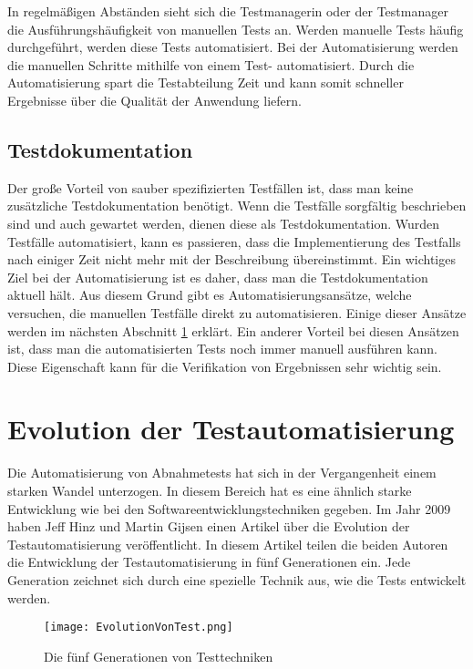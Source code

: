 In regelmäßigen Abständen sieht sich die Testmanagerin oder der Testmanager die Ausführungshäufigkeit von manuellen Tests an. Werden manuelle Tests häufig durchgeführt, werden diese Tests automatisiert. Bei der Automatisierung werden die manuellen Schritte mithilfe von einem Test- automatisiert. Durch die Automatisierung spart die Testabteilung Zeit und kann somit schneller Ergebnisse über die Qualität der Anwendung liefern.

\subsection{Testdokumentation}

Der große Vorteil von sauber spezifizierten Testfällen ist, dass man keine zusätzliche Testdokumentation benötigt. Wenn die Testfälle sorgfältig beschrieben sind und auch gewartet werden, dienen diese als Testdokumentation. Wurden Testfälle automatisiert, kann es passieren, dass die Implementierung des Testfalls nach einiger Zeit nicht mehr mit der Beschreibung übereinstimmt. Ein wichtiges Ziel bei der Automatisierung ist es daher, dass man die Testdokumentation aktuell hält. Aus diesem Grund gibt es Automatisierungsansätze, welche versuchen, die manuellen Testfälle direkt zu automatisieren. Einige dieser Ansätze werden im nächsten Abschnitt \ref{cha:evolution} erklärt. Ein anderer Vorteil bei diesen Ansätzen ist, dass man die automatisierten Tests noch immer manuell ausführen kann. Diese Eigenschaft kann für die Verifikation von Ergebnissen sehr wichtig sein.

\section{Evolution der Testautomatisierung}
\label{cha:evolution}

Die Automatisierung von Abnahmetests hat sich in der Vergangenheit einem starken Wandel unterzogen. In diesem Bereich hat es eine ähnlich starke Entwicklung wie bei den Softwareentwicklungstechniken gegeben. Im Jahr 2009 haben Jeff Hinz und Martin Gijsen einen Artikel \cite{Hinz09} über die Evolution der Testautomatisierung veröffentlicht. In diesem Artikel teilen die beiden Autoren die Entwicklung der Testautomatisierung in fünf Generationen ein. Jede Generation zeichnet sich durch eine spezielle Technik aus, wie die Tests entwickelt werden. 

\begin{figure}
\centering
\texttt{[image: EvolutionVonTest.png]}
\caption{Die fünf Generationen von Testtechniken}
\label{fig:testEvolution}
\end{figure}


